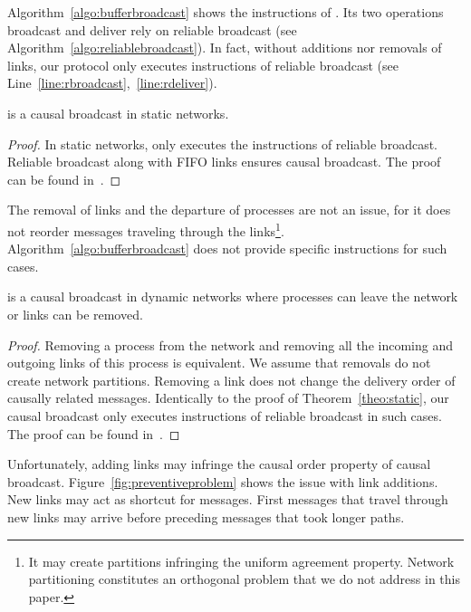Algorithm~\ref{algo:bufferbroadcast} shows the instructions of \CBROADCAST. Its
two operations broadcast and deliver rely on reliable broadcast (see
Algorithm~\ref{algo:reliablebroadcast}). In fact, without additions nor removals
of links, our protocol only executes instructions of reliable broadcast (see
Line~\ref{line:rbroadcast},~\ref{line:rdeliver}).

\begin{theorem}
  \CBROADCAST is a causal broadcast in static networks.
\end{theorem}

\begin{proof}
  In static networks, \CBROADCAST only executes the instructions of reliable
  broadcast. Reliable broadcast along with FIFO links ensures causal broadcast.
  The proof can be found in~\cite{friedman2004causal}.
\end{proof}

The removal of links and the departure of processes are not an issue, for it
does not reorder messages traveling through the links\footnote{It may create
  partitions infringing the uniform agreement property. Network partitioning
  constitutes an orthogonal problem that we do not address in this
  paper.}. Algorithm~\ref{algo:bufferbroadcast} does not provide specific
instructions for such cases.

\begin{lemma}
  \CBROADCAST is a causal broadcast in dynamic networks where processes can
  leave the network or links can be removed.
\end{lemma}

\begin{proof}
  Removing a process from the network and removing all the incoming and outgoing
  links of this process is equivalent. We assume that removals do not create
  network partitions.  Removing a link does not change the delivery order of
  causally related messages. Identically to the proof of
  Theorem~\ref{theo:static}, our causal broadcast only executes instructions of
  reliable broadcast in such cases. The proof can be found
  in~\cite{friedman2004causal}.
\end{proof}

Unfortunately, adding links may infringe the causal order property of causal
broadcast.  Figure~\ref{fig:preventiveproblem} shows the issue with link
additions.  New links may act as shortcut for messages. First messages that
travel through new links may arrive before preceding messages that took longer
paths.

